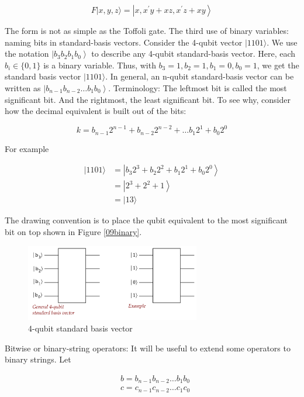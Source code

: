 \documentclass[main.tex]{subfiles}
\begin{document}
    $$
    F|x, y, z\rangle=\left|x, x^{\prime} y+x z, x^{\prime} z+x y\right\rangle
    $$
    
    The form is not as simple as the Toffoli gate. The third use of binary variables: naming bits in standard-basis vectors. Consider the 4-qubit vector $|1101\rangle$. We use the notation $\left|b_{3} b_{2} b_{1} b_{0}\right\rangle$ to describe any 4-qubit standard-basis vector. Here, each $b_{i} \in\{0,1\}$ is a binary variable. Thus, with $b_{3}=1, b_{2}=1, b_{1}=0, b_{0}=1$, we get the standard basis vector $|1101\rangle$. In general, an n-qubit standard-basis vector can be written as $\left|b_{n-1} b_{n-2} \ldots b_{1} b_{0}\right\rangle$. Terminology: The leftmost bit is called the most significant bit. And the rightmost, the least significant bit. To see why, consider how the decimal equivalent is built out of the bits:
    
    $$
    k=b_{n-1} 2^{n-1}+b_{n-2} 2^{n-2}+\ldots b_{1} 2^{1}+b_{0} 2^{0}
    $$
    
    For example
    
    $$
    \begin{aligned}
    |1101\rangle &=\left|b_{3} 2^{3}+b_{2} 2^{2}+b_{1} 2^{1}+b_{0} 2^{0}\right\rangle \\
    &=\left|2^{3}+2^{2}+1\right\rangle \\
    &=|13\rangle
    \end{aligned}
    $$
    
    The drawing convention is to place the qubit equivalent to the most significant bit on top shown in Figure \ref{09binary}.
    
    \begin{figure}
        \centering
        \includegraphics[width=3in]{notes/figs/n10/09binary.png}
        \caption{4-qubit standard basis vector}
        \label{fig:09binary}
    \end{figure}
    
    Bitwise or binary-string operators: It will be useful to extend some operators to binary strings. Let
    
    $$
    \begin{aligned}
    &b=b_{n-1} b_{n-2} \ldots b_{1} b_{0} \\
    &c=c_{n-1} c_{n-2} \ldots c_{1} c_{0}
    \end{aligned}
    $$
    
\end{document}
